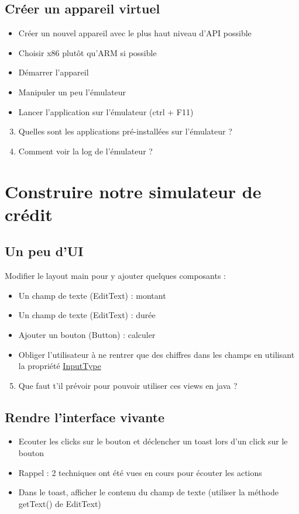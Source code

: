\documentclass{article}
\begin{document}
\subsection{Créer un appareil virtuel}
\begin{itemize}
\item Créer un nouvel appareil avec le plus haut niveau d'API possible
\item Choisir x86 plutôt qu'ARM si possible
\item Démarrer l'appareil
\item Manipuler un peu l'émulateur
\item Lancer l'application sur l'émulateur (ctrl + F11)
\end{itemize}
\begin{enumerate}
 \setcounter{enumi}{2}
\item Quelles sont les applications pré-installées sur l'émulateur ?
\item Comment voir la log de l'émulateur ?
\end{enumerate}
\newpage
\section{Construire notre simulateur de crédit}
\subsection{Un peu d'UI}
Modifier le layout main pour y ajouter quelques composants :
\begin{itemize}
\item Un champ de texte (EditText) : montant
\item Un champ de texte (EditText) : durée
\item Ajouter un bouton (Button) : calculer
\item Obliger l'utilisateur à ne rentrer que des chiffres dans les champs en utilisant la propriété \href{http://developer.android.com/reference/android/widget/TextView.html#attr_android:inputType}{InputType}
\end{itemize}
\begin{enumerate}
 \setcounter{enumi}{4}
\item Que faut t'il prévoir pour pouvoir utiliser ces views en java ?
\end{enumerate}
\subsection{Rendre l'interface vivante}
\begin{itemize}
\item Ecouter les clicks sur le bouton et déclencher un toast lors d'un click sur le bouton
\item Rappel : 2 techniques ont été vues en cours pour écouter les actions
\item Dans le toast, afficher le contenu du champ de texte (utiliser la méthode getText() de EditText)
\end{itemize}
\end{document}
